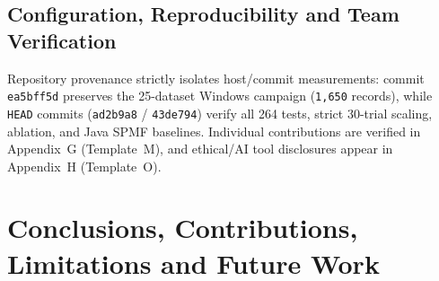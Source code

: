 \section{Configuration, Reproducibility and Team Verification}
Repository provenance strictly isolates host/commit measurements: commit \texttt{ea5bff5d} preserves the 25-dataset Windows campaign (\texttt{1,650} records), while \texttt{HEAD} commits (\texttt{ad2b9a8} / \texttt{43de794}) verify all 264 tests, strict 30-trial scaling, ablation, and Java SPMF baselines. Individual contributions are verified in Appendix~G (Template~M), and ethical/AI tool disclosures appear in Appendix~H (Template~O).\par
\endgroup

\chapter{Conclusions, Contributions, Limitations and Future Work}

\begingroup
\linespread{1.05}\selectfont
\setlength{\parskip}{1.5pt}

